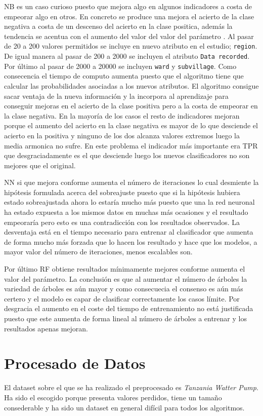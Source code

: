 \documentclass[..]{subfiles}
\begin{document}
NB es un caso curioso puesto que mejora algo en algunos indicadores a costa de empeorar algo en otros. En concreto se produce una mejora el acierto de la clase negativa a costa de un descenso del acierto en la clase positica, además la tendencia se acentua con el aumento del valor del valor del parámetro . Al pasar de 20 a 200 valores permitidos se incluye en nuevo atributo en el estudio; \texttt{region}. De igual manera al pasar de 200 a 2000 se incluyen el atributo \texttt{Data recorded}. Por último al pasar de 2000 a 20000 se incluyen \texttt{ward} y \texttt{subvillage}. Como consecencia el tiempo de computo aumenta puesto que el algoritmo tiene que calcular las probabilidades asociadas a los nuevos atributos. El algoritmo consigue sacar ventaja de la nueva información y la incorpora al aprendizaje para conseguir mejoras en el acierto de la clase positiva pero a la costa de empeorar en la clase negativa. En la mayoría de los casos el resto de indicadores mejoran porque el aumento del acierto en la clase negativa es mayor de lo que desciende el acierto en la positiva y ninguno de los dos alcanza valores extremos luego la media armonica no sufre. En este problema el indicador más importante era TPR que desgraciadamente es el que desciende luego los nuevos clasificadores no son mejores que el original.

NN si que mejora conforme aumenta el número de iteraciones lo cual desmiente la hipótesis formulada acerca del sobreajuste puesto que si la hipótesis hubiera estado sobreajustada ahora lo estaría mucho más puesto que una la red neuronal ha estado expuesta a los mismos datos en muchas más ocasiones y el resultado empeoraría pero esto es una contradicción con los resultados observados. La desventaja está en el tiempo necesario para entrenar al clasificador que aumenta de forma mucho más forzada que lo hacen los resultado y hace que los modelos, a mayor valor del número de iteraciones, menos escalables son.

Por último RF obtiene resultados mínimamente mejores conforme aumenta el valor del parámetro. La conclusión es que al aumentar el número de árboles la variedad de árboles es aún mayor y como consecuecia el consenso es aún más certero y el modelo es capar de clasificar correctamente los casos límite. Por desgracia el aumento en el coste del tiempo de entrenamiento no está justificada puesto que este aumenta de forma lineal al número de árboles a entrenar y los resultados apenas mejoran.



\section{Procesado de Datos}
El dataset sobre el que se ha realizado el preprocesado es \textit{Tanzania Watter Pump}. Ha sido el escogido porque presenta valores perdidos, tiene un tamaño consederable y ha sido un dataset en general difícil para todos los algoritmos.
\end{document}
